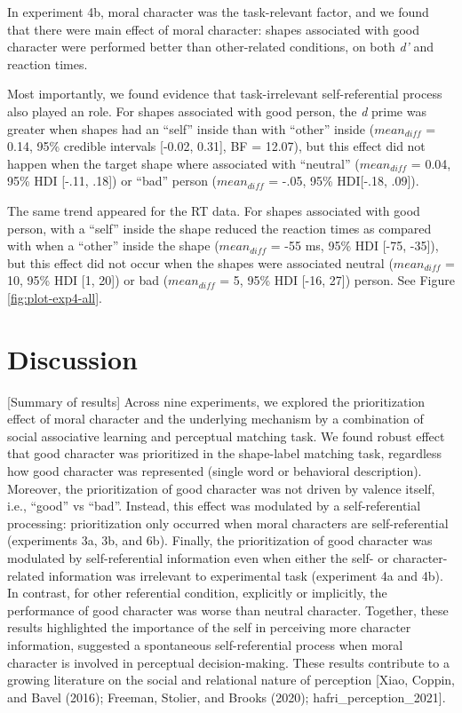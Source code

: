 \documentclass[
  man]{apa6}
\begin{document}
In experiment 4b, moral character was the task-relevant factor, and we found that there were main effect of moral character: shapes associated with good character were performed better than other-related conditions, on both \emph{d'} and reaction times.

Most importantly, we found evidence that task-irrelevant self-referential process also played an role. For shapes associated with good person, the \emph{d} prime was greater when shapes had an ``self'' inside than with ``other'' inside (\(mean_{diff}\) = 0.14, 95\% credible intervals {[}-0.02, 0.31{]}, BF = 12.07), but this effect did not happen when the target shape where associated with ``neutral'' (\(mean_{diff}\) = 0.04, 95\% HDI {[}-.11, .18{]}) or ``bad'' person (\(mean_{diff}\) = -.05, 95\% HDI{[}-.18, .09{]}).

The same trend appeared for the RT data. For shapes associated with good person, with a ``self'' inside the shape reduced the reaction times as compared with when a ``other'' inside the shape (\(mean_{diff}\) = -55 ms, 95\% HDI {[}-75, -35{]}), but this effect did not occur when the shapes were associated neutral (\(mean_{diff}\) = 10, 95\% HDI {[}1, 20{]}) or bad (\(mean_{diff}\) = 5, 95\% HDI {[}-16, 27{]}) person. See Figure \ref{fig:plot-exp4-all}.

\hypertarget{discussion}{%
\section{Discussion}\label{discussion}}

{[}Summary of results{]} Across nine experiments, we explored the prioritization effect of moral character and the underlying mechanism by a combination of social associative learning and perceptual matching task. We found robust effect that good character was prioritized in the shape-label matching task, regardless how good character was represented (single word or behavioral description). Moreover, the prioritization of good character was not driven by valence itself, i.e., ``good'' vs ``bad''. Instead, this effect was modulated by a self-referential processing: prioritization only occurred when moral characters are self-referential (experiments 3a, 3b, and 6b). Finally, the prioritization of good character was modulated by self-referential information even when either the self- or character- related information was irrelevant to experimental task (experiment 4a and 4b). In contrast, for other referential condition, explicitly or implicitly, the performance of good character was worse than neutral character. Together, these results highlighted the importance of the self in perceiving more character information, suggested a spontaneous self-referential process when moral character is involved in perceptual decision-making. These results contribute to a growing literature on the social and relational nature of perception {[}Xiao, Coppin, and Bavel (2016); Freeman, Stolier, and Brooks (2020); hafri\_perception\_2021{]}.
\end{document}
